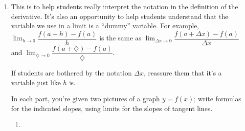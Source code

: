 \documentclass{article}
\begin{document}
\begin{enumerate}
\item  \label{derivative-def-recap}

  \begin{workshop}
    This is to help students really interpret the notation in the definition of the derivative. It's also an opportunity to help students understand that the variable we use in a limit is a ``dummy'' variable. For example, $\displaystyle \lim_{h \to 0} \dfrac{f(a + h) - f(a)}{h}$ is the same as $\displaystyle \lim_{\Delta x \to 0} \dfrac{f(a + \Delta x) - f(a)}{\Delta x}$ and $\displaystyle \lim_{\diamondsuit \to 0} \dfrac{f(a + \diamondsuit) - f(a)}{\diamondsuit}$.

    If students are bothered by the notation $\Delta x$, reassure them that it's a variable just like $h$ is.
  \end{workshop}

  In each part, you're given two pictures of a graph $y = f(x)$; write formulas for the indicated slopes, using limits for the slopes of tangent lines.

  \begin{enumerate}
  \item \

    \vspace{-12pt}


\end{enumerate}
\end{enumerate}
\end{document}
